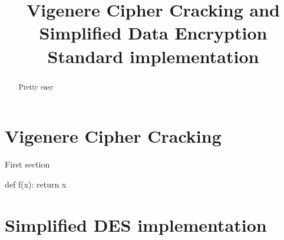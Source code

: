 \documentclass{article}
\title{\textbf{ Vigenere Cipher Cracking and Simplified Data Encryption Standard implementation}}
\author{}
\date{}
\begin{document}
\maketitle \thispagestyle{fancy}

\begin{abstract}
    Pretty easy
    
\end{abstract}

\section{Vigenere Cipher Cracking}
    First section



\begin{python}
    def f(x):
        return x
\end{python}

\section{Simplified DES implementation}
\end{document}
